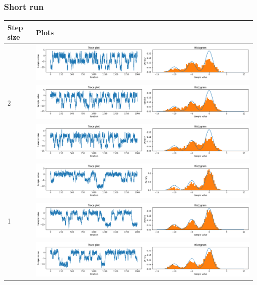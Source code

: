 \documentclass{article}
\theoremstyle{definition}
\newcommand{\1}{\mathbbm{1}}
\begin{document}
\subsubsection{Short run}
{\renewcommand{\arraystretch}{4}%
	\begin{tabular}{|l|l|}
		\hline
	Step size & Plots\\

	\hline
	\multirow{3}{*}{2} & \multicolumn{1}{l}{\includegraphics[width=0.8\linewidth, height=0.1\linewidth, valign=m]{Different variance/21.png}} \\
	& \multicolumn{1}{l}{\includegraphics[width=0.8\linewidth, height=0.1\linewidth, valign=m]{Different variance/22.png}} \\
	& \multicolumn{1}{l}{\includegraphics[width=0.8\linewidth, height=0.1\linewidth, valign=m]{Different variance/23.png}} \\
	\hline
	
	\multirow{3}{*}{1} & \multicolumn{1}{l}{\includegraphics[width=0.8\linewidth, height=0.1\linewidth, valign=m]{Different variance/11.png}} \\
	& \multicolumn{1}{l}{\includegraphics[width=0.8\linewidth, height=0.1\linewidth, valign=m]{Different variance/12.png}} \\
	& \multicolumn{1}{l}{\includegraphics[width=0.8\linewidth, height=0.1\linewidth, valign=m]{Different variance/13.png}} \\
	\hline
	

\end{tabular}}
\end{document}
